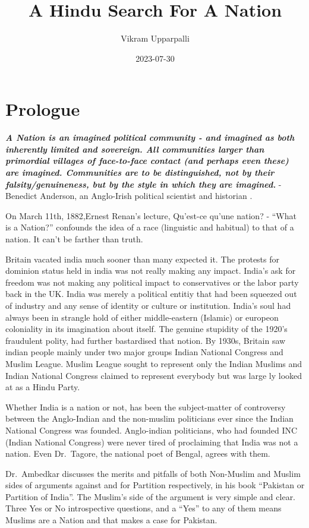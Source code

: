 \documentclass[
]{book}
\title{A Hindu Search For A Nation}
\author{Vikram Upparpalli}
\date{2023-07-30}
\begin{document}
\maketitle

{
\setcounter{tocdepth}{1}
\tableofcontents
}
\hypertarget{intro}{%
\chapter{Prologue}\label{intro}}

\textbf{\emph{A Nation is an imagined political community - and imagined as both inherently limited and sovereign. All communities larger than primordial villages of face-to-face contact (and perhaps even these) are imagined. Communities are to be distinguished, not by their falsity/genuineness, but by the style in which they are imagined.}} - Benedict Anderson, an Anglo-Irish political scientist and historian .

On March 11th, 1882,Ernest Renan's lecture, Qu'est-ce qu'une nation? - ``What is a Nation?'' confounds the idea of a race (linguistic and habitual) to that of a nation. It can't be farther than truth.

Britain vacated india much sooner than many expected it. The protests for dominion status held in india was not really making any impact. India's ask for freedom was not making any political impact to conservatives or the labor party back in the UK. India was merely a political entitiy that had been squeezed out of industry and any sense of identity or culture or institution. India's soul had always been in strangle hold of either middle-eastern (Islamic) or europeon coloniality in its imagination about itself. The genuine stupidity of the 1920's fraudulent polity, had further bastardised that notion. By 1930s, Britain saw indian people mainly under two major groups Indian National Congress and Muslim League. Muslim League sought to represent only the Indian Muslims and Indian National Congress claimed to represent everybody but was large ly looked at as a Hindu Party.

Whether India is a nation or not, has been the subject-matter of controversy between the Anglo-Indian and the non-muslim politicians ever since the Indian National Congress was founded. Anglo-indian politicians, who had founded INC (Indian National Congress) were never tired of proclaiming that India was not a nation. Even Dr.~Tagore, the national poet of Bengal, agrees with them.

Dr.~Ambedkar discusses the merits and pitfalls of both Non-Muslim and Muslim sides of arguments against and for Partition respectively, in his book ``Pakistan or Partition of India''. The Muslim's side of the argument is very simple and clear. Three Yes or No introspective questions, and a ``Yes'' to any of them means Muslims are a Nation and that makes a case for Pakistan.
\end{document}
